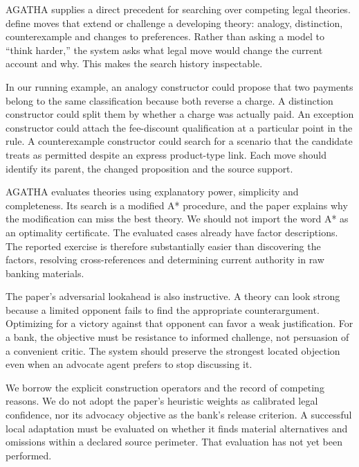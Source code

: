 AGATHA supplies a direct precedent for searching over competing legal theories.
\citet[sections 2--4]{agatha2005} define moves that extend or challenge a developing
theory: analogy, distinction, counterexample and changes to preferences. Rather
than asking a model to ``think harder,'' the system asks what legal move would
change the current account and why. This makes the search history inspectable.

In our running example, an analogy constructor could propose that two payments
belong to the same classification because both reverse a charge. A distinction
constructor could split them by whether a charge was actually paid. An exception
constructor could attach the fee-discount qualification at a particular point in
the rule. A counterexample constructor could search for a scenario that the
candidate treats as permitted despite an express product-type link. Each move
should identify its parent, the changed proposition and the source support.


AGATHA evaluates theories using explanatory power, simplicity and completeness.
Its search is a modified A* procedure, and the paper explains why the modification
can miss the best theory. We should not import the word A* as an optimality
certificate. The evaluated cases already have factor descriptions. The reported
exercise is therefore substantially easier than discovering the factors,
resolving cross-references and determining current authority in raw banking
materials.

The paper's adversarial lookahead is also instructive. A theory can look strong
because a limited opponent fails to find the appropriate counterargument.
Optimizing for a victory against that opponent can favor a weak justification.
For a bank, the objective must be resistance to informed challenge, not persuasion
of a convenient critic. The system should preserve the strongest located
objection even when an advocate agent prefers to stop discussing it.

We borrow the explicit construction operators and the record of competing
reasons. We do not adopt the paper's heuristic weights as calibrated legal
confidence, nor its advocacy objective as the bank's release criterion. A
successful local adaptation must be evaluated on whether it finds material
alternatives and omissions within a declared source perimeter. That evaluation
has not yet been performed.

